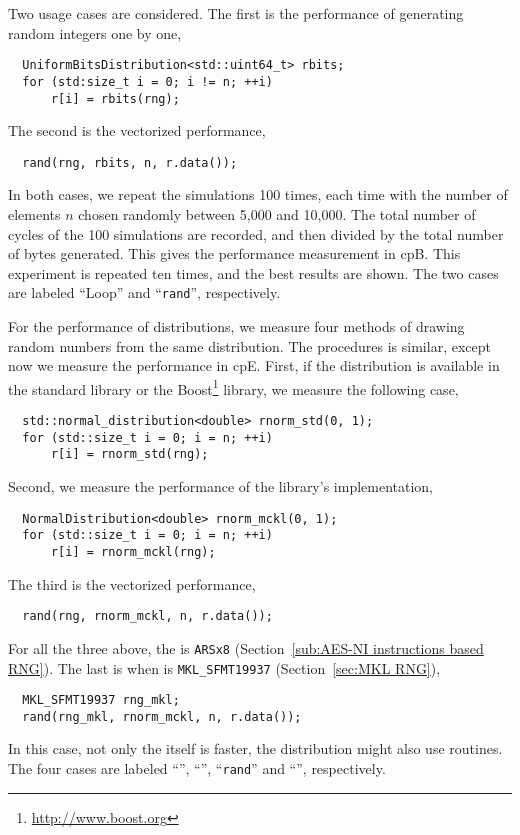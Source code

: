 Two usage cases are considered. The first is the performance of generating
random integers one by one,
\begin{Verbatim}
  UniformBitsDistribution<std::uint64_t> rbits;
  for (std:size_t i = 0; i != n; ++i)
      r[i] = rbits(rng);
\end{Verbatim}
The second is the vectorized performance,
\begin{Verbatim}
  rand(rng, rbits, n, r.data());
\end{Verbatim}
In both cases, we repeat the simulations 100 times, each time with the number
of elements $n$ chosen randomly between 5,000 and 10,000. The total number of
cycles of the 100 simulations are recorded, and then divided by the total
number of bytes generated. This gives the performance measurement in cpB. This
experiment is repeated ten times, and the best results are shown. The two cases
are labeled ``Loop'' and ``\verb|rand|'', respectively.

For the performance of distributions, we measure four methods of drawing random
numbers from the same distribution. The procedures is similar, except now we
measure the performance in cpE. First, if the distribution is available in the
standard library or the Boost\footnote{\url{http://www.boost.org}} library, we
measure the following case,
\begin{Verbatim}
  std::normal_distribution<double> rnorm_std(0, 1);
  for (std::size_t i = 0; i = n; ++i)
      r[i] = rnorm_std(rng);
\end{Verbatim}
Second, we measure the performance of the library's implementation,
\begin{Verbatim}
  NormalDistribution<double> rnorm_mckl(0, 1);
  for (std::size_t i = 0; i = n; ++i)
      r[i] = rnorm_mckl(rng);
\end{Verbatim}
The third is the vectorized performance,
\begin{Verbatim}
  rand(rng, rnorm_mckl, n, r.data());
\end{Verbatim}
For all the three above, the \rng is \verb|ARSx8| (Section~\ref{sub:AES-NI
  instructions based RNG}). The last is when \rng is \verb|MKL_SFMT19937|
(Section~\ref{sec:MKL RNG}),
\begin{Verbatim}
  MKL_SFMT19937 rng_mkl;
  rand(rng_mkl, rnorm_mckl, n, r.data());
\end{Verbatim}
In this case, not only the \rng itself is faster, the distribution might also
use \mkl routines. The four cases are labeled ``\std'', ``\mckl'',
``\verb|rand|'' and ``\mkl'', respectively.

